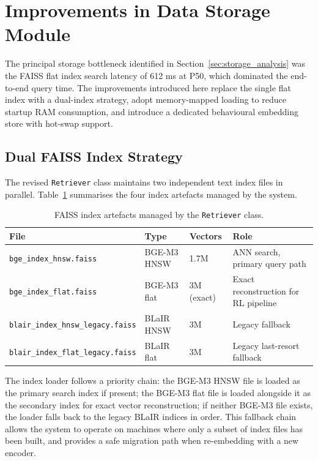 \section{Improvements in Data Storage Module}
\label{sec:storage_improvements}

The principal storage bottleneck identified in Section~\ref{sec:storage_analysis} was the FAISS flat index search latency of 612 ms at P50, which dominated the end-to-end query time.
The improvements introduced here replace the single flat index with a dual-index strategy, adopt memory-mapped loading to reduce startup RAM consumption, and introduce a dedicated behavioural embedding store with hot-swap support.

\subsection{Dual FAISS Index Strategy}
\label{sec:dual_index}

The revised \texttt{Retriever} class maintains two independent text index files in parallel.
Table~\ref{tab:index_files} summarises the four index artefacts managed by the system.

\begin{table}[H]
\centering
\caption{FAISS index artefacts managed by the \texttt{Retriever} class.}
\label{tab:index_files}
\begin{tabular}{p{4.5cm} p{2.0cm} p{2.0cm} p{4.0cm}}
\hline
\textbf{File} & \textbf{Type} & \textbf{Vectors} & \textbf{Role} \\
\hline
\nolinkurl{bge_index_hnsw.faiss}        & BGE-M3 HNSW  & 1.7M         & ANN search, primary query path \\
\nolinkurl{bge_index_flat.faiss}        & BGE-M3 flat  & 3M (exact)   & Exact reconstruction for RL pipeline \\
\nolinkurl{blair_index_hnsw_legacy.faiss} & BLaIR HNSW  & 3M           & Legacy fallback \\
\nolinkurl{blair_index_flat_legacy.faiss} & BLaIR flat  & 3M           & Legacy last-resort fallback \\
\hline
\end{tabular}
\end{table}

The index loader follows a priority chain: the BGE-M3 HNSW file is loaded as the primary search index if present; the BGE-M3 flat file is loaded alongside it as the secondary index for exact vector reconstruction; if neither BGE-M3 file exists, the loader falls back to the legacy BLaIR indices in order.
This fallback chain allows the system to operate on machines where only a subset of index files has been built, and provides a safe migration path when re-embedding with a new encoder.

